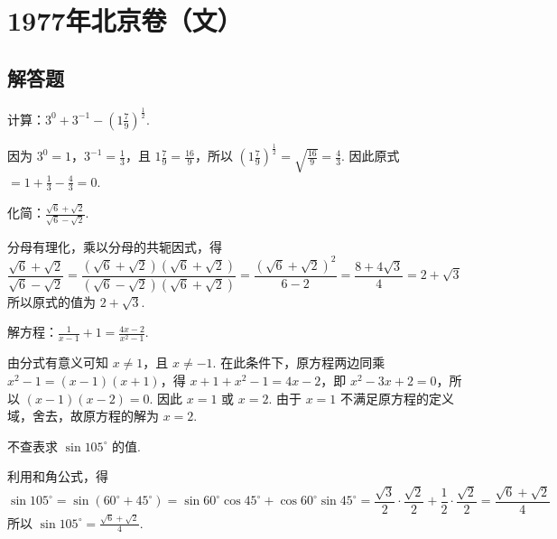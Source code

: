 \chapter{1977年北京卷（文）}

\section{解答题}

\begin{problem}
计算：\(3^{0}+3^{-1}-\left(1\frac{7}{9}\right)^{\frac{1}{2}}\).
\end{problem}

\begin{solution}
因为 \(3^{0}=1\)，\(3^{-1}=\frac{1}{3}\)，且 \(1\frac{7}{9}=\frac{16}{9}\)，所以 \(\left(1\frac{7}{9}\right)^{\frac{1}{2}}=\sqrt{\frac{16}{9}}=\frac{4}{3}\). 因此原式 \(=1+\frac{1}{3}-\frac{4}{3}=0\).
\end{solution}

\begin{problem}
化简：\(\frac{\sqrt{6}+\sqrt{2}}{\sqrt{6}-\sqrt{2}}\).
\end{problem}

\begin{solution}
分母有理化，乘以分母的共轭因式，得
\[
\frac{\sqrt{6}+\sqrt{2}}{\sqrt{6}-\sqrt{2}}=\frac{\left(\sqrt{6}+\sqrt{2}\right)\left(\sqrt{6}+\sqrt{2}\right)}{\left(\sqrt{6}-\sqrt{2}\right)\left(\sqrt{6}+\sqrt{2}\right)}=\frac{\left(\sqrt{6}+\sqrt{2}\right)^2}{6-2}=\frac{8+4\sqrt{3}}{4}=2+\sqrt{3}
\]
所以原式的值为 \(2+\sqrt{3}\).
\end{solution}

\begin{problem}
解方程：\(\frac{1}{x-1}+1=\frac{4x-2}{x^{2}-1}\).
\end{problem}

\begin{solution}
由分式有意义可知 \(x\neq1\)，且 \(x\neq-1\). 在此条件下，原方程两边同乘 \(x^{2}-1=(x-1)(x+1)\)，得 \(x+1+x^{2}-1=4x-2\)，即 \(x^{2}-3x+2=0\)，所以 \(\left(x-1\right)\left(x-2\right)=0\). 因此 \(x=1\) 或 \(x=2\). 由于 \(x=1\) 不满足原方程的定义域，舍去，故原方程的解为 \(x=2\).
\end{solution}

\begin{problem}
不查表求 \(\sin 105^\circ\) 的值.
\end{problem}

\begin{solution}
利用和角公式，得
\[
\sin105^\circ=\sin\left(60^\circ+45^\circ\right)=\sin60^\circ\cos45^\circ+\cos60^\circ\sin45^\circ=\frac{\sqrt{3}}{2}\cdot\frac{\sqrt{2}}{2}+\frac{1}{2}\cdot\frac{\sqrt{2}}{2}=\frac{\sqrt{6}+\sqrt{2}}{4}
\]
所以 \(\sin105^\circ=\frac{\sqrt{6}+\sqrt{2}}{4}\).
\end{solution}

